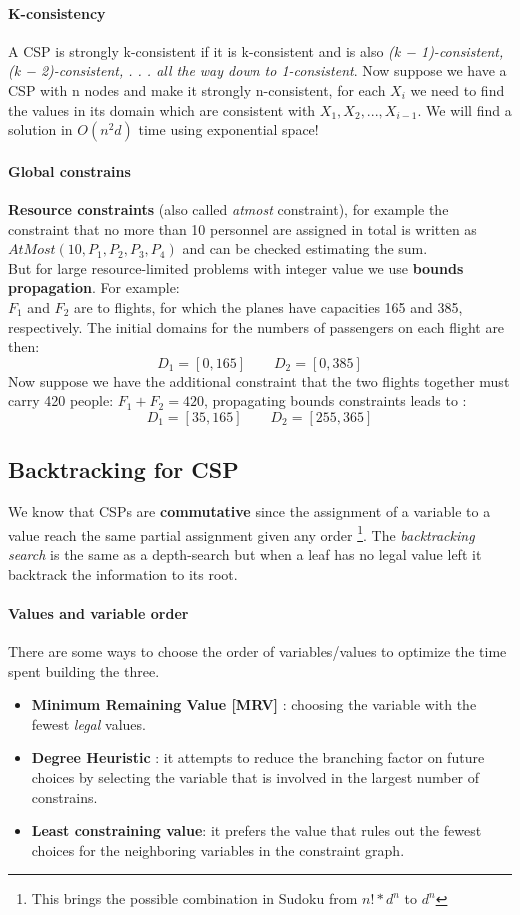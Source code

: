\documentclass[10pt,a4paper]{article}
\begin{document}
\paragraph{K-consistency}
A CSP is strongly k-consistent if it is k-consistent and is also \textit{(k − 1)-consistent, (k − 2)-consistent, . . . all the way down to 1-consistent}. Now suppose we have a CSP with n nodes and make it strongly n-consistent, for each $X_i$ we need to find the values in its domain which are consistent with $X_1,X_2,...,X_{i-1}$. We will find a solution in $O(n^2d)$ time using exponential space!

\paragraph{Global constrains}
\textbf{Resource constraints} (also called \textit{atmost} constraint), for example the constraint that no more than 10 personnel are assigned in total is written as $AtMost(10,P_1,P_2,P_3,P_4)$ and can be checked estimating the sum.\\
But for large resource-limited problems with integer value we use \textbf{bounds propagation}. For example:\\
$F_1$ and $F_2$ are to flights, for which the planes have capacities 165 and 385, respectively. The initial domains for the numbers of passengers on each flight are then:
\[D_1=[0,165] \quad \quad D_2=[0,385]\]
Now suppose we have the additional constraint that the two flights together must carry 420 people: $F_1+F_2=420$, propagating bounds constraints leads to :
\[D_1=[35,165] \quad \quad D_2=[255,365]\]

\subsection{Backtracking for CSP}

We know that CSPs are \textbf{commutative} since the assignment of a variable to a value reach the same partial assignment given any order \footnote{This brings the possible combination in Sudoku from $n!*d^n$ to $d^n$}. The \textit{backtracking search } is the same as a depth-search but when a leaf has no legal value left it backtrack the information to its root.

\paragraph{Values and variable order}
There are some ways to choose the order of variables/values to optimize the time spent building the three.
\begin{itemize}
\item \textbf{Minimum Remaining Value [MRV]} : choosing the variable with the fewest \textit{legal} values.
\item \textbf{Degree Heuristic} : it attempts to reduce the branching factor on future choices by  selecting the variable that is involved in the largest number of constrains.
\item \textbf{Least constraining value}: it prefers the value that rules out the fewest choices for the neighboring variables in the constraint graph.
\end{itemize}
\end{document}
